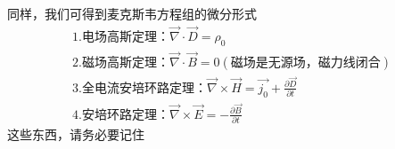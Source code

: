 \documentclass[lang=cn,10pt]{elegantbook}
\begin{document}
	 同样，我们可得到麦克斯韦方程组的微分形式
	 \begin{equation*}
	 	\begin{split}
	 		1.\text{电场高斯定理：}\overrightarrow{\nabla }\cdot \overrightarrow{D}=\rho _0
	 		\\
	 		2.\text{磁场高斯定理：}\overrightarrow{\nabla }\cdot \overrightarrow{B}=0\left( \text{磁场是无源场，磁力线闭合} \right) 
	 		\\
	 		3.\text{全电流安培环路定理：}\overrightarrow{\nabla }\times \overrightarrow{H}=\overrightarrow{j_0}+\frac{\partial \overrightarrow{D}}{\partial t}
	 		\\
	 		4.\text{安培环路定理：}\overrightarrow{\nabla }\times \overrightarrow{E}=-\frac{\partial \overrightarrow{B}}{\partial t}
	 	\end{split}
	 \end{equation*}
	 这些东西，请务必要记住
\end{document}

